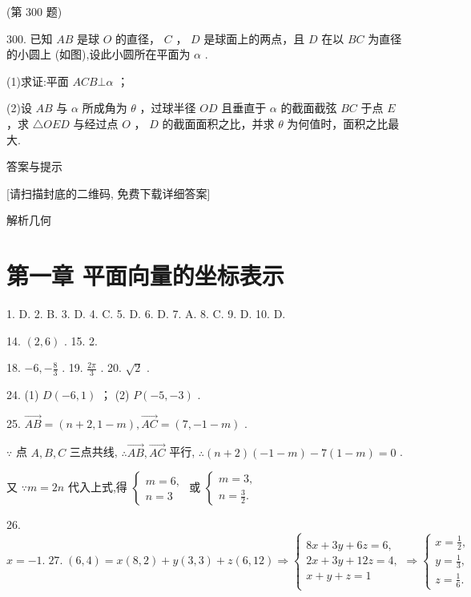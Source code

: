 \documentclass[10pt]{article}
\begin{document}
(第 300 题)

300. 已知 \({AB}\) 是球 \(O\) 的直径， \(C\) ， \(D\) 是球面上的两点，且 \(D\) 在以 \({BC}\) 为直径的小圆上 (如图),设此小圆所在平面为 \(\alpha\) .

(1)求证:平面 \({ACB} \bot  \alpha\) ；

(2)设 \({AB}\) 与 \(\alpha\) 所成角为 \(\theta\) ，过球半径 \({OD}\) 且垂直于 \(\alpha\) 的截面截弦 \({BC}\) 于点 \(E\) ，求 \(\bigtriangleup {OED}\) 与经过点 \(O\) ， \(D\) 的截面面积之比，并求 \(\theta\) 为何值时，面积之比最大.

答案与提示

[请扫描封底的二维码, 免费下载详细答案]

解析几何

\section*{第一章 平面向量的坐标表示}

1. D. 2. B. 3. D. 4. C. 5. D. 6. D. 7. A. 8. C. 9. D. 10. D.

14. \(\left( {2,6}\right)\) . 15. 2.

18. \(- 6, - \frac{8}{3}\) . 19. \(\frac{2\pi }{3}\) . 20. \(\sqrt{2}\) .

24. (1) \(D\left( {-6,1}\right)\) ； (2) \(P\left( {-5, - 3}\right)\) .

25. \(\overrightarrow{AB} = \left( {n + 2,1 - m}\right) ,\overrightarrow{AC} = \left( {7, - 1 - m}\right)\) .

\(\because\) 点 \(A,B,C\) 三点共线, \(\therefore \overrightarrow{AB},\overrightarrow{AC}\) 平行, \(\therefore \left( {n + 2}\right) \left( {-1 - m}\right)  - 7\left( {1 - m}\right)  = 0\) .

又 \(\because m = {2n}\) 代入上式,得 \(\left\{  \begin{array}{l} m = 6, \\  n = 3 \end{array}\right.\) 或 \(\left\{  \begin{array}{l} m = 3, \\  n = \frac{3}{2}. \end{array}\right.\)

26. \(x =  - 1.\;{27}.\;\left( {6,4}\right)  = x\left( {8,2}\right)  + y\left( {3,3}\right)  + z\left( {6,{12}}\right)  \Rightarrow  \left\{  {\begin{array}{l} {8x} + {3y} + {6z} = 6, \\  {2x} + {3y} + {12z} = 4, \\  x + y + z = 1 \end{array} \Rightarrow  \left\{  \begin{array}{l} x = \frac{1}{2}, \\  y = \frac{1}{3}, \\  z = \frac{1}{6}. \end{array}\right. }\right.\)
\end{document}
